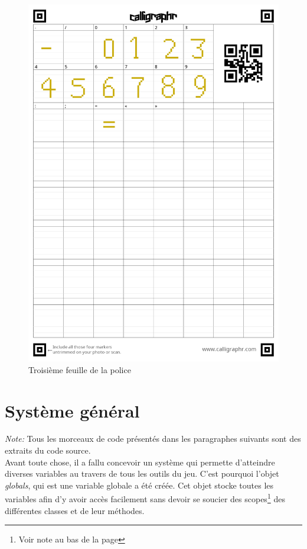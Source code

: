 \documentclass[11pt]{article}
\begin{document}
\begin{appendices}
\begin{figure}[H]
\includegraphics[scale=0.2]{fontPage3}
\caption{Troisième feuille de la police}
\end{figure}

\newpage
\section{Système général}
\textit{Note:} Tous les morceaux de code présentés dans les paragraphes suivants sont des extraits du code source.\\

	Avant toute chose, il a fallu concevoir un système qui permette d'atteindre diverses variables au travers de tous les outils du jeu. C'est pourquoi l'objet \textit{globals}, qui est une variable globale a été créée. Cet objet stocke toutes les variables afin d'y avoir accès facilement sans devoir se soucier des scopes\footnote{Voir note au bas de la page \pageref{scope}} des différentes classes et de leur méthodes.\\
 

\end{appendices}
\end{document}
